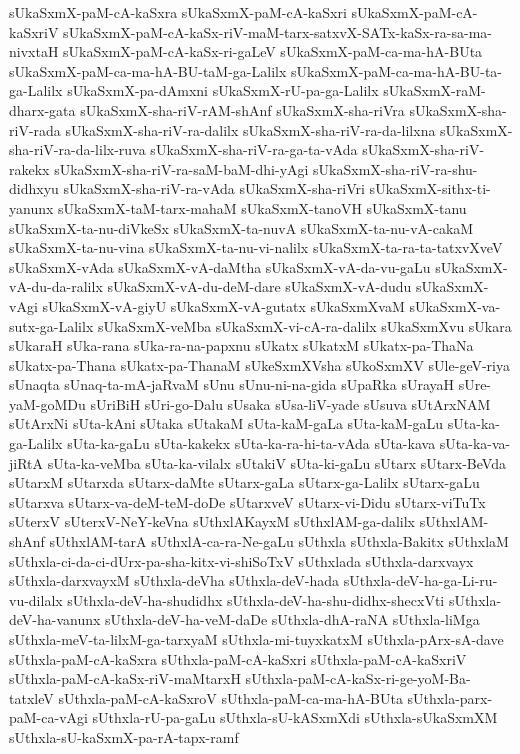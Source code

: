 {sUkaSxmX-paM-cA-kaSxra
sUkaSxmX-paM-cA-kaSxri
sUkaSxmX-paM-cA-kaSxriV
sUkaSxmX-paM-cA-kaSx-riV-maM-tarx-satxvX-SATx-kaSx-ra-sa-ma-nivxtaH
sUkaSxmX-paM-cA-kaSx-ri-gaLeV
sUkaSxmX-paM-ca-ma-hA-BUta
sUkaSxmX-paM-ca-ma-hA-BU-taM-ga-Lalilx
sUkaSxmX-paM-ca-ma-hA-BU-ta-ga-Lalilx
sUkaSxmX-pa-dAmxni
sUkaSxmX-rU-pa-ga-Lalilx
sUkaSxmX-raM-dharx-gata
sUkaSxmX-sha-riV-rAM-shAnf
sUkaSxmX-sha-riVra
sUkaSxmX-sha-riV-rada
sUkaSxmX-sha-riV-ra-dalilx
sUkaSxmX-sha-riV-ra-da-lilxna
sUkaSxmX-sha-riV-ra-da-lilx-ruva
sUkaSxmX-sha-riV-ra-ga-ta-vAda
sUkaSxmX-sha-riV-rakekx
sUkaSxmX-sha-riV-ra-saM-baM-dhi-yAgi
sUkaSxmX-sha-riV-ra-shu-didhxyu
sUkaSxmX-sha-riV-ra-vAda
sUkaSxmX-sha-riVri
sUkaSxmX-sithx-ti-yanunx
sUkaSxmX-taM-tarx-mahaM
sUkaSxmX-tanoVH
sUkaSxmX-tanu
sUkaSxmX-ta-nu-diVkeSx
sUkaSxmX-ta-nuvA
sUkaSxmX-ta-nu-vA-cakaM
sUkaSxmX-ta-nu-vina
sUkaSxmX-ta-nu-vi-nalilx
sUkaSxmX-ta-ra-ta-tatxvXveV
sUkaSxmX-vAda
sUkaSxmX-vA-daMtha
sUkaSxmX-vA-da-vu-gaLu
sUkaSxmX-vA-du-da-ralilx
sUkaSxmX-vA-du-deM-dare
sUkaSxmX-vA-dudu
sUkaSxmX-vAgi
sUkaSxmX-vA-giyU
sUkaSxmX-vA-gutatx
sUkaSxmXvaM
sUkaSxmX-va-sutx-ga-Lalilx
sUkaSxmX-veMba
sUkaSxmX-vi-cA-ra-dalilx
sUkaSxmXvu
sUkara
sUkaraH
sUka-rana
sUka-ra-na-papxnu
sUkatx
sUkatxM
sUkatx-pa-ThaNa
sUkatx-pa-Thana
sUkatx-pa-ThanaM
sUkeSxmXVsha
sUkoSxmXV
sUle-geV-riya
sUnaqta
sUnaq-ta-mA-jaRvaM
sUnu
sUnu-ni-na-gida
sUpaRka
sUrayaH
sUre-yaM-goMDu
sUriBiH
sUri-go-Dalu
sUsaka
sUsa-liV-yade
sUsuva
sUtArxNAM
sUtArxNi
sUta-kAni
sUtaka
sUtakaM
sUta-kaM-gaLa
sUta-kaM-gaLu
sUta-ka-ga-Lalilx
sUta-ka-gaLu
sUta-kakekx
sUta-ka-ra-hi-ta-vAda
sUta-kava
sUta-ka-va-jiRtA
sUta-ka-veMba
sUta-ka-vilalx
sUtakiV
sUta-ki-gaLu
sUtarx
sUtarx-BeVda
sUtarxM
sUtarxda
sUtarx-daMte
sUtarx-gaLa
sUtarx-ga-Lalilx
sUtarx-gaLu
sUtarxva
sUtarx-va-deM-teM-doDe
sUtarxveV
sUtarx-vi-Didu
sUtarx-viTuTx
sUterxV
sUterxV-NeY-keVna
sUthxlAKayxM
sUthxlAM-ga-dalilx
sUthxlAM-shAnf
sUthxlAM-tarA
sUthxlA-ca-ra-Ne-gaLu
sUthxla
sUthxla-Bakitx
sUthxlaM
sUthxla-ci-da-ci-dUrx-pa-sha-kitx-vi-shiSoTxV
sUthxlada
sUthxla-darxvayx
sUthxla-darxvayxM
sUthxla-deVha
sUthxla-deV-hada
sUthxla-deV-ha-ga-Li-ru-vu-dilalx
sUthxla-deV-ha-shudidhx
sUthxla-deV-ha-shu-didhx-shecxVti
sUthxla-deV-ha-vanunx
sUthxla-deV-ha-veM-daDe
sUthxla-dhA-raNA
sUthxla-liMga
sUthxla-meV-ta-lilxM-ga-tarxyaM
sUthxla-mi-tuyxkatxM
sUthxla-pArx-sA-dave
sUthxla-paM-cA-kaSxra
sUthxla-paM-cA-kaSxri
sUthxla-paM-cA-kaSxriV
sUthxla-paM-cA-kaSx-riV-maMtarxH
sUthxla-paM-cA-kaSx-ri-ge-yoM-Ba-tatxleV
sUthxla-paM-cA-kaSxroV
sUthxla-paM-ca-ma-hA-BUta
sUthxla-parx-paM-ca-vAgi
sUthxla-rU-pa-gaLu
sUthxla-sU-kASxmXdi
sUthxla-sUkaSxmXM
sUthxla-sU-kaSxmX-pa-rA-tapx-ramf
}

